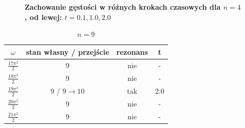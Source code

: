 \documentclass[11pt,a4paper]{article}
\begin{document}
\begin{figure}[ht!]
\begin{multicols}{3}
    \end{multicols}
    \caption{\textbf{Zachowanie gęstości w różnych krokach czasowych dla $n=4$, od lewej: $t=0.1,1.0,2.0$}}
\end{figure}
\pagebreak


\begin{table}[h!]
\vspace{1.5cm}
\begin{center}
\begin{tabular}{|| c | c | c | c ||}
    \hline
    $\omega$ & stan własny / przejście & rezonans & t\\
    \hline
    $\frac{17\pi^2}{2}$ & 9 & nie & -\\
    \hline
    $\frac{18\pi^2}{2}$ & 9 & nie & -\\
    \hline
    $\frac{19\pi^2}{2}$ & 9 / $9\rightarrow10$ & tak & 2.0\\
    \hline
    $\frac{20\pi^2}{2}$ & 9 & nie & -\\
    \hline
    $\frac{21\pi^2}{2}$ & 9 & nie & -\\
    \hline
\end{tabular}
\caption{$n=9$}
\end{center}
\end{table}
\end{document}
